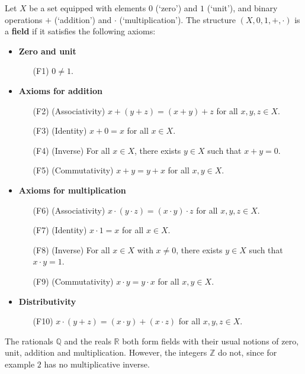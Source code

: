 \begin{axioms}
\label{axField}
Let $X$ be a set equipped with elements $0$ (`zero') and $1$ (`unit'), and binary operations $+$ (`addition') and $\cdot$ (`multiplication'). The structure $(X,0,1,+,{\cdot})$ is a \textbf{field} if it satisfies the following axioms:
\begin{itemize}
\item \textbf{Zero and unit}
\begin{itemize}[leftmargin=30pt]
\item[(F1)] $0 \ne 1$.
\end{itemize}
\item \textbf{Axioms for addition}
\begin{itemize}[leftmargin=30pt]
\item[(F2)] (Associativity) $x+(y+z) = (x+y)+z$ for all $x,y,z \in X$.
\item[(F3)] (Identity) $x+0=x$ for all $x \in X$.
\item[(F4)] (Inverse) For all $x \in X$, there exists $y \in X$ such that $x+y=0$.
\item[(F5)] (Commutativity) $x+y=y+x$ for all $x,y \in X$.
\end{itemize}
\item \textbf{Axioms for multiplication}
\begin{itemize}[leftmargin=30pt]
\item[(F6)] (Associativity) $x \cdot (y \cdot z) = (x \cdot y) \cdot z$ for all $x,y,z \in X$.
\item[(F7)] (Identity) $x \cdot 1 = x$ for all $x \in X$.
\item[(F8)] (Inverse) For all $x \in X$ with $x \ne 0$, there exists $y \in X$ such that $x \cdot y = 1$.
\item[(F9)] (Commutativity) $x \cdot y = y \cdot x$ for all $x,y \in X$.
\end{itemize}
\item \textbf{Distributivity}
\begin{itemize}[leftmargin=30pt]
\item[(F10)] $x \cdot (y + z) = (x \cdot y) + (x \cdot z)$ for all $x,y,z \in X$.
\end{itemize}
\end{itemize}
\end{axioms}

\begin{example}
The rationals $\mathbb{Q}$ and the reals $\mathbb{R}$ both form fields with their usual notions of zero, unit, addition and multiplication. However, the integers $\mathbb{Z}$ do not, since for example $2$ has no multiplicative inverse.
\end{example}

